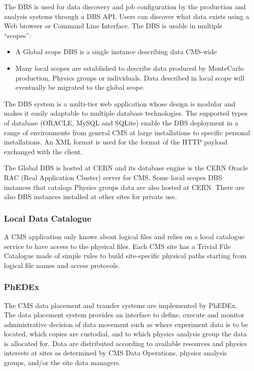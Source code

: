 The DBS is used for data discovery and job configuration by the production and analysis systems through a DBS API. 
Users can discover what data exists using a Web browser or Command Line Interface.
The DBS is usable in multiple “scopes”:
\begin{itemize}
\item A Global scope DBS is a single instance describing data CMS-wide %
\item Many local scopes are established to describe data produced by MonteCarlo production, Physics groups or individuals. Data described in local scope will eventually be migrated to the global scope. 
\end{itemize}
The DBS system is a multi-tier web application whose design is modular and makes it easily adaptable to multiple database technologies. The supported types of database (ORACLE, MySQL and SQLite) enable the DBS deployment in a range of environments from general CMS at large installations to specific personal installations.
An XML format is used for the format of the HTTP payload exchanged with the client.

The Global DBS is hosted at CERN and its database engine is the CERN Oracle RAC (Real Application Cluster) server for CMS. Some local scopes DBS instances that catalogs Physics groups data are also hosted at CERN. There are also DBS instances installed at other sites for private use. 

\subsubsection{Local Data Catalogue}
\label{sec:3_1_2}
A CMS application only knows about logical files and relies on a local catalogue service to have access to the physical files.
Each CMS site has a Trivial File Catalogue made of simple rules to build site-specific physical paths starting from logical file names and access protocols.

\subsubsection{PhEDEx}
\label{sec:3_1_3}
The CMS data placement and transfer systems are implemented by
PhEDEx\cite{RefPhEDEx}. The data placement system provides an
interface to define, execute and monitor administrative decision of
data movement such as where experiment data is to be located, which
copies are custodial, and to which physics analysis group the data is
allocated for.  Data are distributed according to available resources
and physics interests at sites as determined by CMS Data Operations,
physics analysis groups, and/or the site data managers.

